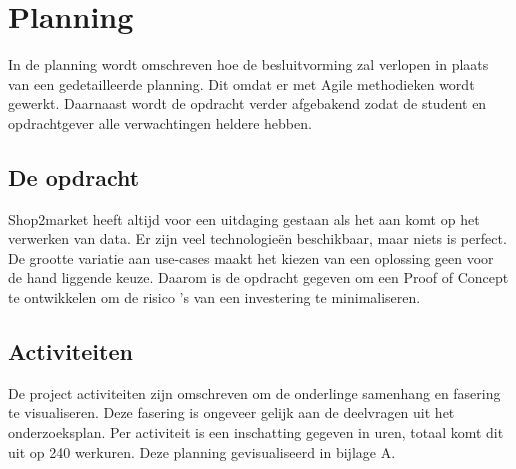 \chapter{Planning} %

In de planning wordt omschreven hoe de besluitvorming zal verlopen in plaats van een gedetailleerde planning. Dit omdat er met Agile methodieken wordt gewerkt. Daarnaast wordt de opdracht verder afgebakend zodat de student en opdrachtgever alle verwachtingen heldere hebben. 

\section{De opdracht} %

Shop2market heeft altijd voor een uitdaging gestaan als het aan komt op het verwerken van data. Er zijn veel technologieën beschikbaar, maar niets is perfect. De grootte variatie aan use-cases maakt het kiezen van een oplossing geen voor de hand liggende keuze.
Daarom is de opdracht gegeven om een Proof of Concept te ontwikkelen om de risico 's van een investering te minimaliseren.


\section{Activiteiten}

De project activiteiten zijn omschreven om de onderlinge samenhang en fasering te visualiseren. Deze fasering is ongeveer gelijk aan de deelvragen uit het onderzoeksplan. Per activiteit is een inschatting gegeven in uren, totaal komt dit uit op 240 werkuren. Deze planning gevisualiseerd in bijlage A.

